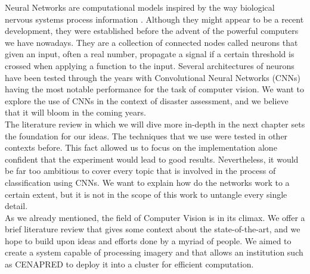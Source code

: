 Neural Networks are computational models inspired by the way biological nervous systems process information \cite{aleksander1990introduction}. Although they might appear to be a recent development, they were established before the advent of the powerful computers we have nowadays. They are a collection of connected nodes called neurons that given an input, often a real number, propagate a signal if a certain threshold is crossed when applying a function to the input. Several architectures of neurons have been tested through the years with Convolutional Neural Networks (CNNs) having the most notable performance for the task of computer vision. We want to explore the use of CNNs in the context of disaster assessment, and we believe that it will bloom in the coming years.\\

The literature review in which we will dive more in-depth in the next chapter sets the foundation for our ideas. The techniques that we use were tested in other contexts before. This fact allowed us to focus on the implementation alone confident that the experiment would lead to good results. Nevertheless, it would be far too ambitious to cover every topic that is involved in the process of classification using CNNs. We want to explain how do the networks work to a certain extent, but it is not in the scope of this work to untangle every single detail.\\

As we already mentioned, the field of Computer Vision is in its climax. We offer a brief literature review that gives some context about the state-of-the-art, and we hope to build upon ideas and efforts done by a myriad of people. We aimed to create a system capable of processing imagery and that allows an institution such as CENAPRED to deploy it into a cluster for efficient computation.\\